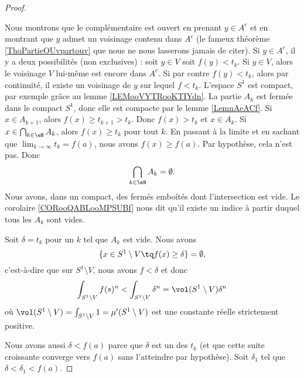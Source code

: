 \begin{proof}
\begin{subproof}
		Nous montrons que le complémentaire est ouvert en prenant \( y\in A^c\) et en montrant que \( y\) admet un voisinage contenu dans \( A^c\) (le fameux théorème \ref{ThoPartieOUvpartouv} que nous ne nous lasserons jamais de citer). Si \( y\in A^c\), il y a deux possibilités (non exclusives) : soit \( y\in V\) soit \( f(y)<t_k\). Si \( y\in V\), alors le voisinage \( V\) lui-même est encore dans \( A^c\). Si par contre \( f(y)<t_k\), alors par continuité, il existe un voisinage de \( y\) sur lequel \( f<t_k\).
		L'espace \( S^1\) est compact, par exemple grâce au lemme \ref{LEMooVYTRooKTIYdn}. La partie \( A_k\) est fermée dans le compact \( S^1\), donc elle est compacte par le lemme \ref{LemnAeACf}.
		\spitem[\( A_{k+1}\subset A_k\)]
		Si \( x\in A_{k+1}\), alors \( f(x)\geq t_{k+1}>t_k\). Donc \( f(x)>t_k\) et \( x\in A_k\).
		Si \( x\in\bigcap_{k\in \eN}A_k\), alors \( f(x)\geq t_k\) pour tout \( k\). En passant à la limite et en sachant que \( \lim_{k\to \infty} t_k=f(a)\), nous avons \( f(x)\geq f(a)\). Par hypothèse, cela n'est pas. Donc
		\begin{equation}
			\bigcap_{k\in \eN}A_k=\emptyset.
		\end{equation}
		Nous avons, dans un compact, des fermés emboîtés dont l'intersection est vide. Le corolaire \ref{CORooQABLooMPSUBf} nous dit qu'il existe un indice à partir duquel tous les \( A_k\) sont vides.
	\end{subproof}

	Soit \( \delta=t_k\) pour un \( k\) tel que \( A_k\) est vide. Nous avons
	\begin{equation}
		\{ x\in S^1\setminus V\tq f(x)\geq \delta \}=\emptyset,
	\end{equation}
	c'est-à-dire que sur \( S^1\setminus V\), nous avons \( f<\delta\) et donc
	\begin{equation}
		\int_{S^1\setminus V}f(s)^n<\int_{S^1\setminus V}\delta^n=\vol(S^1\setminus V)\delta^n
	\end{equation}
	où \( \vol(S^1\setminus V)=\int_{S^1\setminus V}1=\mu'(S^1\setminus V)\) est une constante réelle strictement positive.

	Nous avons aussi \( \delta<f(a)\) parce que \( \delta\) est un des \( t_k\) (et que cette suite croissante converge vers \( f(a)\) sans l'atteindre par hypothèse). Soit \( \delta_1\) tel que \( \delta<\delta_1<f(a)\).


\end{proof}
